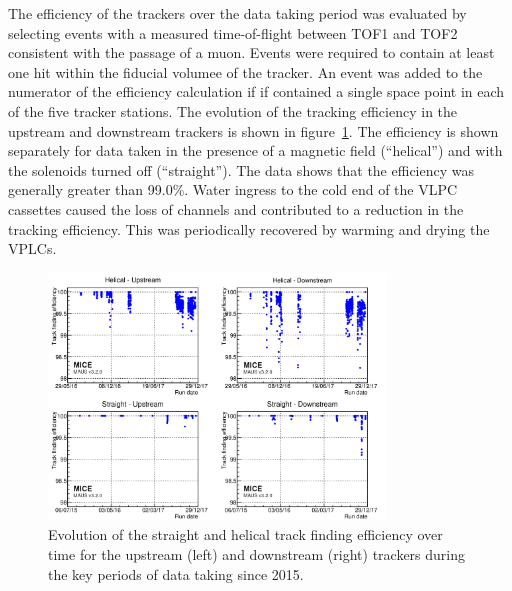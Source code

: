 The efficiency of the trackers over the data taking period was
evaluated by selecting events with a measured time-of-flight between
TOF1 and TOF2 consistent with the passage of a muon.
Events were required to contain at least one hit within the fiducial
volumee of the tracker.
An event was added to the numerator of the efficiency calculation if
if contained a single space point in each of the five tracker
stations.
The evolution of the tracking efficiency in the upstream and
downstream trackers is shown in
figure~\ref{fig:trackers:performance:historical}.
The efficiency is shown separately for data taken in the presence of a
magnetic field (``helical'') and with the solenoids turned off
(``straight'').
The data shows that the efficiency was generally greater than 99.0\%.
Water ingress to the cold end of the VLPC cassettes caused the loss of
channels and contributed to a reduction in the tracking efficiency.
This was periodically recovered by warming and drying the VPLCs. \\
\begin{figure}
  \begin{center}
    \includegraphics[width=0.80\textwidth]{historical_analysis_plot_logo.png}
  \end{center}
  \caption{
    Evolution of the straight and helical track finding efficiency
    over time for the upstream (left) and downstream (right) trackers
    during the key periods of data taking since 2015.
  }
  \label{fig:trackers:performance:historical} 
\end{figure}


